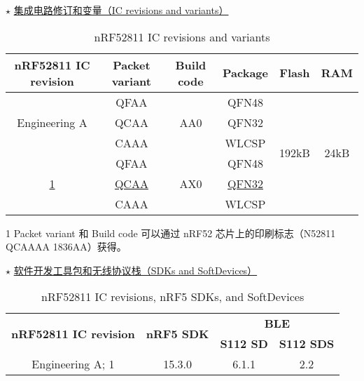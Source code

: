 \documentclass{WHUResearch}  %
\begin{document}
$\star$ \href{https://infocenter.nordicsemi.com/index.jsp?topic=\%2Fcomp_matrix_nrf52811\%2FCOMP\%2Fnrf52811\%2Fnrf52811_ble_qdid_qual_matrix.html&cp=3_2_2_4}{集成电路修订和变量（IC revisions and variants）}
\begin{table}[htbp]
  \centering
  \caption{nRF52811 IC revisions and variants}
  \begin{threeparttable}
	\begin{tabular}{|c|c|c|c|c|c|}
	\hline
   \textbf{nRF52811 IC revision}  & \textbf{Packet variant}\tnote{1} & \textbf{Build code}\tnote{1} & \textbf{Package} & \textbf{Flash} & \textbf{RAM} \\ \hline
	\multirow{3}{*}{Engineering A} & QFAA 						   & \multirow{3}{*}{AA0} & QFN48 & \multirow{6}{*}{192kB} & \multirow{6}{*}{24kB} \\ \cline{2-2} \cline{4-4}
                  					  & QCAA                     &                   	& QFN32 &                   &                   \\ \cline{2-2} \cline{4-4}
                  					  & CAAA							&                   	& WLCSP &                   &                   \\ \cline{1-4}
	\multirow{3}{*}{\underline{1}} & QFAA							& \multirow{3}{*}{AX0} & QFN48 &                   &                   \\ \cline{2-2} \cline{4-4}
                  					  & \underline{QCAA	}			&                   	& \underline{QFN32} &                   &                   \\ \cline{2-2} \cline{4-4}
                 					  & CAAA							&                   	& WLCSP &                   &                   \\ \hline
	\end{tabular}
	\begin{tablenotes}
	  \footnotesize
        \item[1] Packet variant 和 Build code 可以通过 nRF52 芯片上的印刷标志（N52811 QCAAAA 1836AA）获得。
	\end{tablenotes}
  \end{threeparttable}
\end{table}

$\star$ \href{https://infocenter.nordicsemi.com/index.jsp?topic=\%2Fcomp_matrix_nrf52811\%2FCOMP\%2Fnrf52811\%2Fnrf52811_ble_qdid_qual_matrix.html&cp=3_2_2_4}{软件开发工具包和无线协议栈（SDKs and SoftDevices）}
\begin{table}[htbp]
  \centering
  \caption{nRF52811 IC revisions, nRF5 SDKs, and SoftDevices}
	\begin{tabular}{|c|c|c|c|}
	\hline
 	\multirow{2}{*}{\textbf{nRF52811 IC revision}} & \multirow{2}{*}{\textbf{nRF5 SDK}} &  \multicolumn{2}{c|}{\textbf{BLE}} \\ \cline{3-4}
 															  &  											 & \textbf{S112 SD} & \textbf{S112 SDS} \\ \hline
 	Engineering A; 1 									  & 15.3.0 									 & 6.1.1 				 & 2.2 \\ \hline
	\end{tabular}
\end{table}
\end{document}
